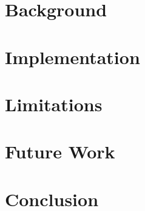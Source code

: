 \documentclass[conference]{IEEEtran}
\begin{document}
\section{Background}


\section{Implementation}


\section{Limitations}


\section{Future Work}


\section{Conclusion}


\printbibliography
\end{document}
